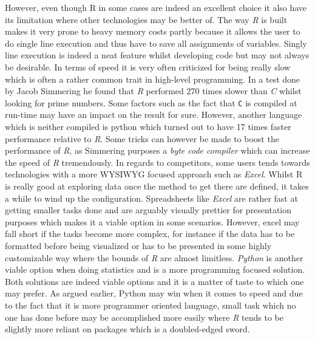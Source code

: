 \documentclass[Report.tex]{subfiles}
\begin{document}
 However, even though R in some cases are indeed an excellent choice it also have its limitation where other technologies may be better of. The way \textit{R} is built makes it very prone to heavy memory costs partly because it allows the user to do single line execution and thus have to save all assignments of variables. Singly line execution is indeed a neat feature whilst developing code but may not always be desirable.  In terms of speed it is very often criticized for being really slow which is often a rather common trait in high-level programming. In a test done by Jacob Simmering he found that \textit{R} performed 270 times slower than \textit{C} whilst looking for prime numbers. Some factors such as the fact that \texttt{C} is compiled at run-time may have an impact on the result for sure. However, another language which is neither compiled is python which turned out to have 17 times faster performance relative to \textit{R}. Some tricks can however be made to boost the performance of \textit{R}, as Simmering purposes a \textit{byte code compiler} which can increase the speed of \textit{R} tremendously. In regards to competitors, some users tends towards technologies with a more WYSIWYG focused approach such as \textit{Excel}. Whilst R is really good at exploring data once the method to get there are defined, it takes a while to wind up the configuration. Spreadsheets like \textit{Excel} are rather fast at getting smaller tasks done and are arguably visually prettier for presentation purposes which makes it a viable option in some scenarios. However, excel may fall short if the tasks become more complex, for instance if the data has to be formatted before being visualized or has to be presented in some highly customizable way where the bounds of \textit{R} are almost limitless. \textit{Python} is another viable option when doing statistics and is a more programming focused solution. Both solutions are indeed viable options and it is a matter of taste to which one may prefer. As argued earlier, Python may win when it comes to speed and due to the fact that it is more programmer oriented language, small task which no one has done before may be accomplished more easily where \textit{R} tends to be slightly more reliant on packages which is a doubled-edged sword.
\end{document}
